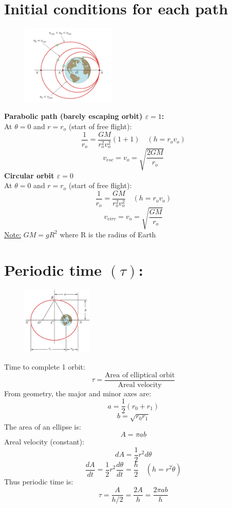 \documentclass[10pt, fleqn]{article}
\begin{document}
\begin{multicols}{2}
\section*{Initial conditions for each path}
\begin{figure}[H]
    \centering
    \includegraphics[width=0.4\textwidth]{conditions.png}
\end{figure}
\textbf{Parabolic path (barely escaping orbit) $\varepsilon =1$:}\\
At $\theta=0$ and $r=r_o$ (start of free flight):
\[\frac{1}{r_o} = \frac{GM}{r_o^2v_o^2}(1 + 1) \quad (h=r_ov_o)\]
\[v_{esc}=v_o=\sqrt{\frac{2GM}{r_o}}\]
\textbf{Circular orbit $\varepsilon=0$}\\
At $\theta=0$ and $r=r_o$ (start of free flight):
\[\frac{1}{r_o}=\frac{GM}{r_o^2v_o^2} \quad (h=r_ov_o)\]
\[v_{circ}=v_o=\sqrt{\frac{GM}{r_o}}\]
\underline{Note:} $GM = gR^2$ where R is the radius of Earth
\section*{Periodic time $(\tau)$:} 
\begin{figure}[H]
    \centering
    \includegraphics[width=0.3\textwidth]{periodic time.png}
\end{figure}
Time to complete 1 orbit:
\[\tau=\frac{\text{Area of elliptical orbit}}{\text{Areal velocity}}\]
From geometry, the major and minor axes are:
\[a = \frac{1}{2}(r_0 + r_1)\]
\[b = \sqrt{r_0r_1}\]
The area of an ellipse is:
\[A=\pi ab\]
Areal velocity (constant):
\[dA=\frac{1}{2}r^2d\theta\]
\[\frac{dA}{dt}=\frac{1}{2}r^2\frac{d\theta}{dt}=\frac{h}{2} \quad (h=r^2\dot{\theta})\]
Thus periodic time is:
\[\boxed{\tau = \frac{A}{h/2} = \frac{2A}{h} = \frac{2\pi ab}{h}}\] 
\end{multicols}
\end{document}
